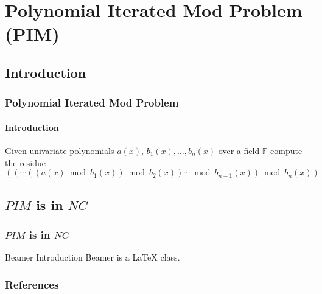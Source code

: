 \documentclass[article,8pt]{beamer}%
\newcommand{\bbF}{\mathbb{F}}
\begin{document}
\section{Polynomial Iterated Mod Problem (PIM)}
\subsection{Introduction}
\begin{frame}
\frametitle{Polynomial Iterated Mod Problem}
\framesubtitle{Introduction}
\begin{definition}
	Given univariate polynomials $a(x)$, $b_1(x),\dots, b_n(x)$ over a field $\bbF$ compute the residue $((\cdots ((a(x)\bmod{b_1(x)})\bmod{b_2(x)})\cdots\bmod{b_{n-1}(x)})\bmod{b_{n}(x)})$
\end{definition}
\end{frame}

\subsection{$PIM$ is in $NC$}
\begin{frame}
\frametitle{$PIM$ is in $NC$}

\begin{block}{Beamer Introduction}
Beamer is a { \LaTeX} class.
\end{block}

\end{frame}


\begin{frame}%
\frametitle{References}
\printbibliography
\end{frame}
\end{document}
